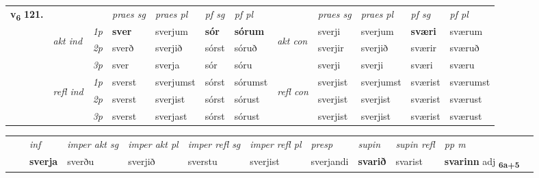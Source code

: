 \begin{tabular}{llllllllllll} \toprule
\multirow{4}{*}{{{\textbf{v{\textsubscript{6}}} \Large{\textbf{121.}}}}}  & &   &  \textit{praes sg}  & \textit{praes pl}  &\textit{ pf sg} & \textit{pf pl} &  &  \textit{praes sg}  & \textit{praes pl}  & \textit{pf sg} & \textit{pf pl } \\*
	\cmidrule{4-7} \cmidrule{9-12}
 & \multirow{3}{*}{\begin{turn}{90}\textit{akt ind}\end{turn}} & {\textit{1p}} & \textbf{sver} & sverjum    & \textbf{sór} & \textbf{sórum} & \multirow{3}{*}{\begin{turn}{90}\textit{akt con}\end{turn}} &sverji & sverjum & \textbf{sværi} & sværum\\*
& &  {\textit{2p}} &  sverð  & sverjið   & sórst & sóruð & & sverjir & sverjið & sværir & sværuð \\*
& &  {\textit{3p}} & sver & sverja   & sór & sóru & & sverji & sverji& sværi & sværu  \\*
\cmidrule{4-7} \cmidrule{9-12}
 &\multirow{3}{*}{\begin{turn}{90}\textit{refl ind}\end{turn}} & {\textit{1p}} & sverst & sverjumst    & sórst & sórumst & \multirow{3}{*}{\begin{turn}{90}\textit{refl con}\end{turn}}  &sverjist & sverjumst & sværist & sværumst\\*
 &&  {\textit{2p}} &  sverst  & sverjist   & sórst & sórust & &sverjist & sverjist & sværist & sværust \\*
& &  {\textit{3p}} & sverst & sverjast   & sórst & sórust & & sverjist & sverjist& sværist & sværust  \\*
\cmidrule{4-7} \cmidrule{9-12}
\end{tabular}


\begin{tabular}{llllllllllll}
 & & \textit{inf} & \textit{imper akt sg} & \textit{imper akt pl} & \textit{imper refl sg} & \textit{imper refl pl} & \textit{presp} & \textit{supin} & \textit{supin refl} & \textit{pp m}     \\*
  & & \textbf{sverja} & sverðu  & sverjið & sverstu & sverjist & sverjandi &  \textbf{svarið} & svarist & \textbf{svarinn} adj \textbf{\textsubscript{6a+5}} \\*
\cmidrule{1-12}
\end{tabular}



